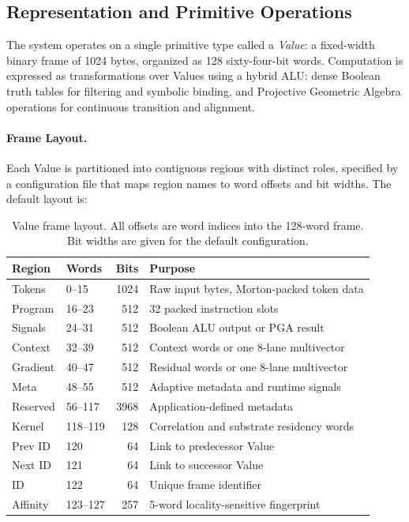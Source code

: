 \subsection{Representation and Primitive Operations}
\label{sec:representation}

The system operates on a single primitive type called a \emph{Value}: a
fixed-width binary frame of 1024 bytes, organized as 128 sixty-four-bit
words.  Computation is expressed as transformations over Values using a
hybrid ALU: dense Boolean truth tables for filtering and symbolic
binding, and Projective Geometric Algebra operations for continuous
transition and alignment.

\paragraph{Frame Layout.}
Each Value is partitioned into contiguous regions with distinct roles,
specified by a configuration file that maps region names to word offsets
and bit widths.  The default layout is:

\begin{table}[h]
  \centering
  \caption{Value frame layout.  All offsets are word indices into the
           128-word frame.  Bit widths are given for the default
           configuration.}
  \label{tab:value_layout}
  \begin{tabular}{llrl}
    \toprule
    \textbf{Region} & \textbf{Words} & \textbf{Bits} & \textbf{Purpose} \\
    \midrule
    Tokens    & 0--15    & 1024 & Raw input bytes, Morton-packed token data \\
    Program   & 16--23   & 512  & 32 packed instruction slots \\
    Signals   & 24--31   & 512  & Boolean ALU output or PGA result \\
    Context   & 32--39   & 512  & Context words or one 8-lane multivector \\
    Gradient  & 40--47   & 512  & Residual words or one 8-lane multivector \\
    Meta      & 48--55   & 512  & Adaptive metadata and runtime signals \\
    Reserved  & 56--117  & 3968 & Application-defined metadata \\
    Kernel    & 118--119 & 128  & Correlation and substrate residency words \\
    Prev ID   & 120      & 64   & Link to predecessor Value \\
    Next ID   & 121      & 64   & Link to successor Value \\
    ID        & 122      & 64   & Unique frame identifier \\
    Affinity  & 123--127 & 257  & 5-word locality-sensitive fingerprint \\
    \bottomrule
  \end{tabular}
\end{table}

